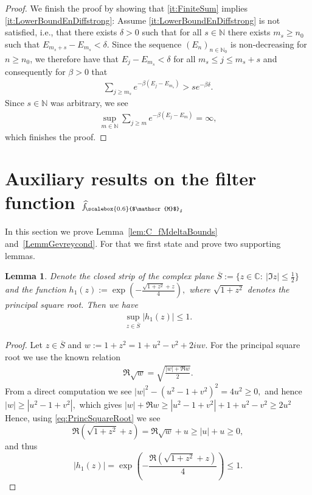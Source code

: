 \documentclass[11pt]{amsart}
\newcommand{\1}{\mathbbm{1}}
\newcommand{\N}{\mathbb{N}}
\newcommand{\hatfMdelta}{\widehat{f}_{\!\scalebox{0.6}{$\mathscr{M}$}_\delta}}
\newcommand{\bin}[1]{}
\theoremstyle{plain}
\newtheorem{lemma}[theorem]{Lemma}
\theoremstyle{definition}
\theoremstyle{remark}
\numberwithin{equation}{section}
\begin{document}
\begin{proof}
We finish the proof by showing that \eqref{it:FiniteSum} implies \eqref{it:LowerBoundEnDiffstrong}: Assume \eqref{it:LowerBoundEnDiffstrong} is not satisfied, i.e., that there exists $\delta>0$ such that for all $s\in\N$ there exists $m_s\ge n_0$ such that $E_{m_s+s}- E_{m_s}<\delta.$ \bin{For $s$ large enough we can without loss of generality\footnote{To see this assume that there exists $\delta>$ such that for all $s\in\N$ there exists $m_s<n_0$ satisfying $E_{m_s+s}-E_{m_s}<\delta.$ But this implies that the subsequence $\left(E_{m_s+s}\right)_{s\in \N}$ is uniformly bounded as $E_{m_s+s}<\delta +\max_{m<n_0}E_m$. From this we immediately see that \eqref{it:FiniteSum} cannot hold true.} assume that $m_s\ge n_0$ and } Since the sequence $(E_n)_{n\in\N_0}$ is non-decreasing for $n\ge n_0$, we therefore have that $E_{j}- E_{m_s}<\delta$ for all $m_s\le j\le m_s+s$ and consequently for $\beta>0$ that
\begin{align*}
    \sum_{j\ge m_s} e^{-\beta(E_j-E_{m_s})} > s e^{-\beta\delta}.
\end{align*}
Since $s\in \N$ was arbitrary, we see
\begin{align*}
     \sup_{m\in\N}\sum_{j\ge m} e^{-\beta(E_j-E_m)} = \infty,
\end{align*}
which finishes the proof.

\end{proof}





\section{Auxiliary results on the filter function $\hatfMdelta$}
\label{sec:fmDeltaProofs}
In this section we prove Lemma~\ref{lem:C_fMdeltaBounds} and~\ref{LemmGevreycond}. For that we first state and prove two supporting lemmas.
\begin{lemma}
\label{lem:AaaahFm} 
    Denote the closed strip of the complex plane $
\overline S:=\{z\in\mathbb C:\ |\Im z|\le \tfrac12\}$ and the function $h_1(z):= \exp\left(-\frac{\sqrt{1+z^2} +z}{4}\right),$ where $\sqrt{1+z^2}$ denotes the principal square root. Then we have 
\begin{align}
    \sup_{z\in\overline S}|h_1(z)|\le 1.
\end{align}
\end{lemma}
\begin{proof}
Let $z\in\overline S$ and 
$
w:=1+z^2=1+u^2-v^2+2iuv.$
For the principal square root we use the known relation
\begin{align}
\label{eq:PrincSquareRoot}
\Re\sqrt{w}=\sqrt{\frac{|w|+\Re w}{2}}.
\end{align}
From a direct computation we see $
|w|^2-(u^2-1+v^2)^2=4u^2\ge 0,
$ and hence
$
|w|\ge |u^2-1+v^2|,
$
which gives 
$
|w|+\Re w \ge  |u^2-1+v^2| + 1 + u^2 -v^2 \ge 2u^2$
Hence, using \eqref{eq:PrincSquareRoot} we see
\[
\Re(\sqrt{1+z^2}+z)=\Re\sqrt{w}+u\ge |u|+u\ge 0,
\]
and thus
\[
|h_1(z)|
=
\exp\!\left(-\frac{\Re(\sqrt{1+z^2}+z)}{4}\right)
\le 1.
\]
\end{proof}
\end{document}
